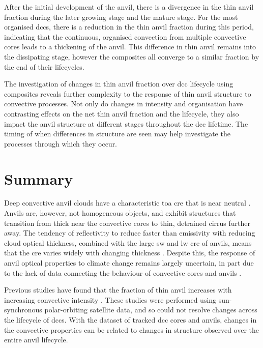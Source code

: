 After the initial development of the anvil, there is a divergence in the thin anvil fraction during the later growing stage and the mature stage.
For the most organised \acrshort{dcc}s, there is a reduction in the thin anvil fraction during this period, indicating that the continuous, organised convection from multiple convective cores leads to a thickening of the anvil.
This difference in thin anvil remains into the dissipating stage, however the composites all converge to a similar fraction by the end of their lifecycles.

The investigation of changes in thin anvil fraction over \acrshort{dcc} lifecycle using composites reveals further complexity to the response of thin anvil structure to convective processes.
Not only do changes in intensity and organisation have contrasting effects on the net thin anvil fraction and the lifecycle, they also impact the anvil structure at different stages throughout the \acrshort{dcc} lifetime.
The timing of when differences in structure are seen may help investigate the processes through which they occur.


\section{Summary}

Deep convective anvil clouds have a characteristic \acrshort{toa} \acrshort{cre} that is near neutral \citep{hartmann_tropical_2016}.
Anvils are, however, not homogeneous objects, and exhibit structures that transition from thick near the convective cores to thin, detrained cirrus further away.
The tendency of reflectivity to reduce faster than emissivity with reducing cloud optical thickness, combined with the large \acrshort{sw} and \acrshort{lw} \acrshort{cre} of anvils, means that the \acrshort{cre} varies widely with changing thickness \citep{berry_cloud_2014}.
Despite this, the response of anvil optical properties to climate change remains largely uncertain, in part due to the lack of data connecting the behaviour of convective cores and anvils \cite{gasparini_opinion_2023}.

Previous studies have found that the fraction of thin anvil increases with increasing convective intensity \citep{protopapadaki_upper_2017, takahashi_relationships_2017}.
These studies were performed using sun-synchronous polar-orbiting satellite data, and so could not resolve changes across the lifecycle of \acrshort{dcc}s.
With the dataset of tracked \acrshort{dcc} cores and anvils, changes in the convective properties can be related to changes in structure observed over the entire anvil lifecycle.

